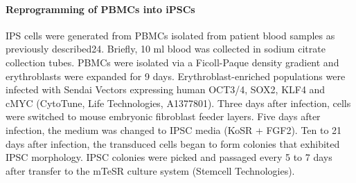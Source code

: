 \paragraph{Reprogramming of PBMCs into iPSCs}
IPS cells were generated from PBMCs isolated from patient blood samples as previously described24. Briefly, 10 ml blood was collected in sodium citrate collection tubes. PBMCs were isolated via a Ficoll-Paque density gradient and erythroblasts were expanded for 9 days. Erythroblast-enriched populations were infected with Sendai Vectors expressing human OCT3/4, SOX2, KLF4 and cMYC (CytoTune, Life Technologies, A1377801). Three days after infection, cells were switched to mouse embryonic fibroblast feeder layers. Five days after infection, the medium was changed to IPSC media (KoSR + FGF2). Ten to 21 days after infection, the transduced cells began to form colonies that exhibited IPSC morphology. IPSC colonies were picked and passaged every 5 to 7 days after  transfer to the mTeSR culture system (Stemcell Technologies). 


